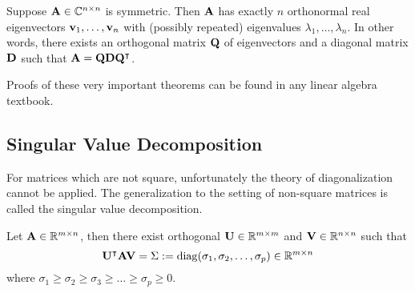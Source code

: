 \begin{theorem}\label{thm-spec}
Suppose $\MA \in \C^{n \times n}$ is symmetric. Then $\MA$ has exactly $n$ orthonormal real eigenvectors $\vv_1, \ldots, \vv_n$ with (possibly repeated) eigenvalues $\lambda_1, \ldots, \lambda_n$. In other words, there exists an orthogonal matrix $\MQ$ of eigenvectors and a diagonal matrix $\MD$ such that 
$\MA = \MQ\MD\MQ^\intercal$.
\end{theorem}

Proofs of these very important theorems can be found in any linear algebra textbook.

\subsection{Singular Value Decomposition}

For matrices which are not square, unfortunately the theory of diagonalization cannot be applied. The generalization to the setting of non-square matrices is called the singular value decomposition.

\begin{theorem}
Let $\MA \in \R^{m \times n}$, then there exist orthogonal $\MU \in \R^{m \times m}$ and $\MV \in \R^{n \times n}$ such that 
$$\MU^\intercal \MA \MV = \bSigma := \diag(\sigma_1, \sigma_2, \ldots, \sigma_p) \in \mathbb R^{m \times n}$$
where $\sigma_1 \geq \sigma_2 \geq \sigma_3 \geq \ldots \geq \sigma_p \geq 0.$
\end{theorem}

